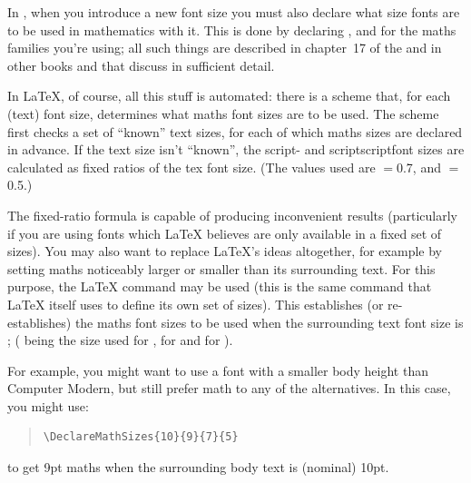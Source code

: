 
In \plaintex{}, when you introduce a new font size you must also
declare what size fonts are to be used in mathematics with it.  This
is done by declaring ,  and
 for the maths families you're using; all such
things are described in chapter~17 of the %
 and in other books and
 that discuss \plaintex{} in sufficient
detail.

In \LaTeX{}, of course, all this stuff is automated: there is a scheme
that, for each (text) font size, determines what maths font sizes are
to be used.  The scheme first checks a set of ``known'' text sizes,
for each of which maths sizes are declared in advance.  If the text
size isn't ``known'', the script- and scriptscriptfont sizes are
calculated as fixed ratios of the tex font size.  (The values used are
\ensuremath{=}0.7, and
\ensuremath{=}0.5.)

The fixed-ratio formula is capable of producing inconvenient results
(particularly if you are using fonts which \LaTeX{} believes are only
available in a fixed set of sizes).  You may also want to replace
\LaTeX{}'s ideas altogether, for example by setting maths noticeably
larger or smaller than its surrounding text.  For this purpose, the
\LaTeX{} command
may be used (this is the same command that \LaTeX{} itself uses to
define its own set of sizes).  This establishes (or re-establishes)
the maths font sizes to be used when the surrounding text font size is
\texttt{}; (\texttt{} being the size used for
, \texttt{} for  and
\texttt{} for ).

For example, you might want to use a font with a smaller body height
than Computer Modern, but still prefer  math to any of the
alternatives.  In this case, you might use:
\begin{quote}
\begin{verbatim}
\DeclareMathSizes{10}{9}{7}{5}
\end{verbatim}
\end{quote}
to get 9pt maths when the surrounding body text is (nominal) 10pt.

